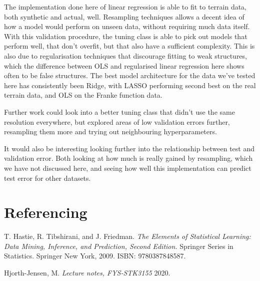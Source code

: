 \documentclass[11pt, a4paper]{report}
\begin{document}
The implementation done here of linear regression is able to fit to terrain data, both synthetic and actual, well. Resampling techniques allows a decent idea of how a model would perform on unseen data, without requiring much data itself. With this validation procedure, the tuning class is able to pick out models that perform well, that don't overfit, but that also have a sufficient complexity. This is also due to regularisation techniques that discourage fitting to weak structures, which the difference between OLS and regularised linear regression here shows often to be false structures. The best model architecture for the data we've tested here has consistently been Ridge, with LASSO performing second best on the real terrain data, and OLS on the Franke function data.

Further work could look into a better tuning class that didn't use the same resolution everywhere, but explored areas of low validation errors further, resampling them more and trying out neighbouring hyperparameters.

It would also be interesting looking further into the relationship between test and validation error. Both looking at how much is really gained by resampling, which we have not discussed here, and seeing how well this implementation can predict test error for other datasets.

\chapter{Referencing}

T. Hastie, R. Tibshirani, and J. Friedman. \textit{The Elements of Statistical Learning: Data Mining, Inference, and Prediction, Second Edition.} Springer Series in Statistics. Springer New York, 2009. ISBN: 9780387848587.

Hjorth-Jensen, M. \textit{Lecture notes, FYS-STK3155} 2020.
\end{document}
